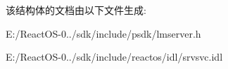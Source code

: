 该结构体的文档由以下文件生成\+:\begin{DoxyCompactItemize}
\item 
E\+:/\+React\+O\+S-\/0../sdk/include/psdk/lmserver.\+h\item 
E\+:/\+React\+O\+S-\/0../sdk/include/reactos/idl/srvsvc.\+idl\end{DoxyCompactItemize}
